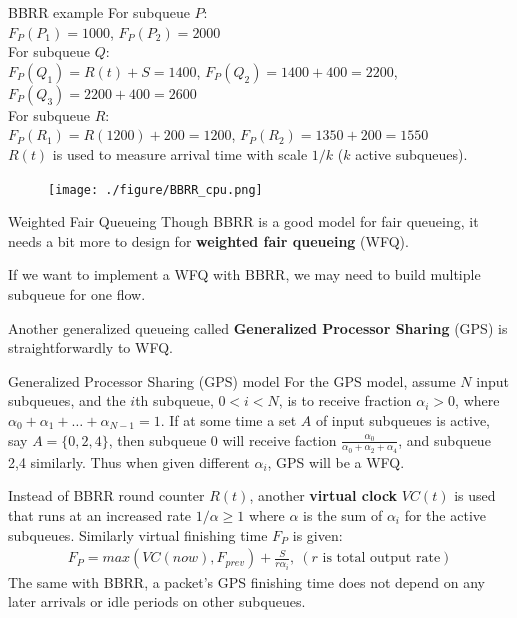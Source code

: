 \documentclass[10pt]{beamer}
\begin{document}
\begin{frame}{BBRR example}
For subqueue $P$: \\
$F_P(P_1) = 1000$, 
$F_P(P_2) = 2000$ \\
For subqueue $Q$: \\
$F_P(Q_1) = R(t) + S = 1400$, 
$F_P(Q_2) = 1400+400 = 2200$, 
$F_P(Q_3) = 2200+400 = 2600$\\
For subqueue $R$: \\
$F_P(R_1) = R(1200)+200 = 1200$,
$F_P(R_2) = 1350+200 = 1550$ \\
$R(t)$ is used to measure arrival time with scale $1/k$ ($k$ active subqueues). %
\begin{figure}
\texttt{[image: ./figure/BBRR\_cpu.png]}
\end{figure}
\end{frame}

\begin{frame}{Weighted Fair Queueing}
Though BBRR is a good model for fair queueing, it needs a bit more to design for \textbf{weighted fair queueing} (WFQ).

If we want to implement a WFQ with BBRR, we may need to build multiple subqueue for one flow. 

Another generalized queueing called \textbf{Generalized Processor Sharing} (GPS) is straightforwardly to WFQ. 
\end{frame}

\begin{frame}{Generalized Processor Sharing (GPS) model}
For the GPS model, assume $N$ input subqueues, and the $i$th subqueue, $0<i<N$, is to receive fraction $\alpha_i>0$, where $\alpha_0+\alpha_1+\ldots+\alpha_{N-1}=1$.
If at some time a set $A$ of input subqueues is active, say $A=\lbrace 0,2,4\rbrace$, then subqueue 0 will receive faction $\frac{\alpha_0}{\alpha_0+\alpha_2+\alpha_4}$, and subqueue 2,4 similarly.
Thus when given different $\alpha_i$, GPS will be a WFQ.

Instead of BBRR round counter $R(t)$, another \textbf{virtual clock} $VC(t)$ is used that runs at an increased rate $1/\alpha\geq 1$ where $\alpha$ is the sum of $\alpha_i$ for the active subqueues. 
Similarly virtual finishing time $F_P$ is given:
\begin{align}
F_P = max(VC(now), F_{prev}) + \frac{S}{r\alpha_i},\ (r \text{ is total output rate})
\end{align}
The same with BBRR, a packet's GPS finishing time does not depend on any later arrivals or idle periods on other subqueues. 
\end{frame}
\end{document}
